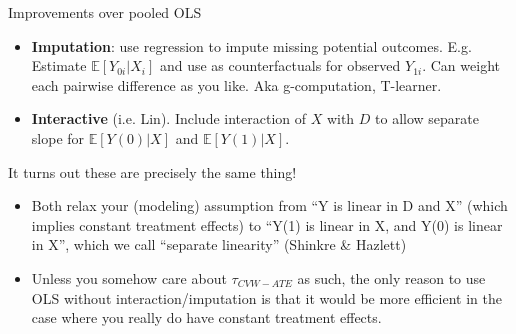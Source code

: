 \documentclass[xcolor=dvipsnames]{beamer}
\newcommand\E{\mathbb{E}}
\begin{document}
\begin{frame}{Improvements over pooled OLS}
\small
\begin{itemize}
\item<1-> \textbf{Imputation}: use regression to impute missing potential outcomes. E.g.  Estimate $\E[Y_{0i}|X_i]$ and use as counterfactuals for observed $Y_{1i}$. Can weight each pairwise difference as you like. Aka g-computation, T-learner.
\item<2-> \textbf{Interactive} (i.e. Lin). Include interaction of $X$ with $D$ to allow separate slope for $\E[Y(0)|X]$ and $\E[Y(1)|X]$.
\end{itemize}
\bigskip
{} It turns out these are precisely the same thing!\\
\begin{itemize}
\item Both relax your (modeling) assumption from ``Y is linear in D and X'' (which implies constant treatment effects) to ``Y(1) is linear in X, and Y(0) is linear in X'', which we call ``separate linearity'' (Shinkre \& Hazlett)
\item Unless you somehow care about $\tau_{CVW-ATE}$ as such, the only reason to use OLS without interaction/imputation is that it would be more efficient in the case where you really do have constant treatment effects. 
\end{itemize}
\end{frame}
\end{document}
